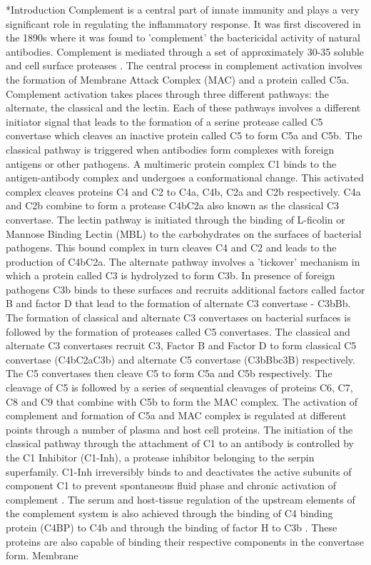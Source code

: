 \documentclass[12pt]{article}
\makeatletter
\renewcommand\section{\@startsection
	{subsection}{2}{0mm}
	{-0.2in}
	{0.05\baselineskip}
	{\normalfont\large\bfseries}}
\makeatother
\begin{document}
\section*{Introduction}
Complement is a central part of innate immunity and plays a very significant role in regulating the inflammatory response. It was first discovered in the 1890s where it was found to 'complement' the bactericidal activity of natural antibodies. Complement is mediated through a set of approximately 30-35 soluble and cell surface proteases \cite{}. The central process in complement activation involves the formation of Membrane Attack Complex (MAC) and a protein called C5a. Complement activation takes places through three different pathways: the alternate, the classical and the lectin. Each of these pathways involves a different initiator signal that leads to the formation of a serine protease called C5 convertase which cleaves an inactive protein called C5 to form C5a and C5b. The classical pathway is triggered when antibodies form complexes with foreign antigens or other pathogens. A multimeric protein complex C1 binds to the antigen-antibody complex and undergoes a conformational change. This activated complex cleaves proteins C4 and C2 to C4a, C4b, C2a and C2b respectively. C4a and C2b combine to form a protease C4bC2a also known as the classical C3 convertase. The lectin pathway is initiated through the binding of L-ficolin or Mannose Binding Lectin (MBL) to the carbohydrates on the surfaces of bacterial pathogens. This bound complex in turn cleaves C4 and C2 and leads to the production of C4bC2a. The alternate pathway involves a 'tickover' mechanism in which a protein called C3 is hydrolyzed to form C3b. In presence of foreign pathogens C3b binds to these surfaces and recruits  additional factors called factor B and factor D that lead to the formation of alternate C3 convertase - C3bBb. The formation of classical and alternate C3 convertases on bacterial surfaces is followed by the formation of proteases called C5 convertases. The classical and alternate C3 convertases recruit C3, Factor B and Factor D to form classical C5 convertase (C4bC2aC3b) and alternate C5 convertase (C3bBbc3B) respectively. The C5 convertases then cleave C5 to form C5a and C5b respectively. 	The cleavage of C5 is followed by a series of sequential cleavages of proteins C6, C7, C8 and C9 that combine with C5b to form the MAC complex. The activation of complement and formation of C5a and MAC complex is regulated at different points through a number of plasma and host cell proteins. The initiation of the classical pathway through the attachment of C1 to an antibody is controlled by the C1 Inhibitor (C1-Inh), a protease inhibitor belonging to the serpin superfamily. C1-Inh irreversibly binds to and deactivates the active subunits of component C1 to prevent spontaneous fluid phase and chronic activation of complement \cite{walker1995complement}. The serum and host-tissue regulation of the upstream elements of the complement system is also achieved through the binding of C4 binding protein (C4BP) to C4b and through the binding of factor H to C3b \cite{blom2001structural}. These proteins are also capable of binding their respective components in the convertase form. Membrane 
\end{document}
